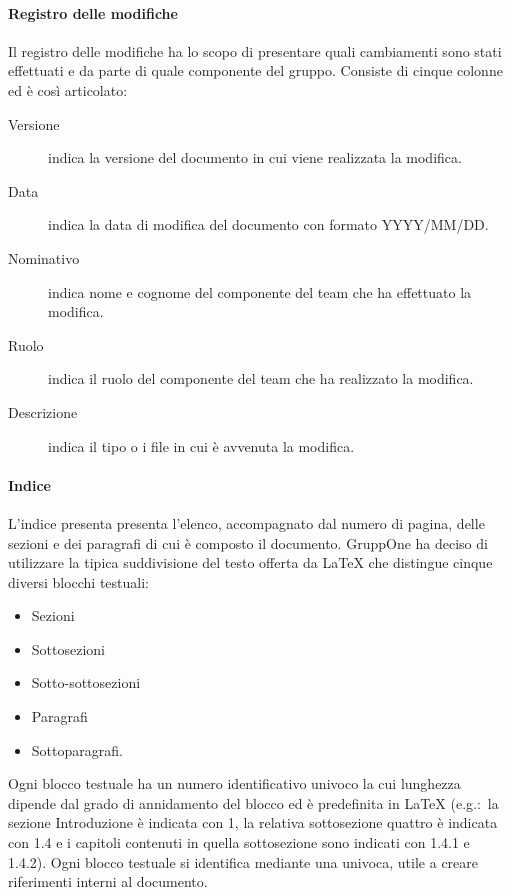\documentclass[../norme-di-progetto.tex]{subfiles}
\begin{document}
\paragraph{Registro delle modifiche}%
\label{par:registro_delle_modifiche}
Il registro delle modifiche ha lo scopo di presentare quali cambiamenti sono stati effettuati e da parte di quale componente del gruppo. Consiste di cinque colonne ed è così articolato:
\begin{description}
  \item [Versione] indica la versione del documento in cui viene realizzata la modifica.
  \item [Data] indica la data di modifica del documento con formato YYYY/MM/DD\@.
  \item [Nominativo] indica nome e cognome del componente del team che ha effettuato la modifica.
  \item [Ruolo] indica il ruolo del componente del team che ha realizzato la modifica.
  \item [Descrizione] indica il tipo o i file in cui è avvenuta la modifica.
\end{description}

\paragraph{Indice}%
\label{par:indice}
L'indice presenta presenta l'elenco, accompagnato dal numero di pagina, delle sezioni e dei paragrafi di cui è composto il documento.
GruppOne ha deciso di utilizzare la tipica suddivisione del testo offerta da \LaTeX{} che distingue cinque diversi blocchi testuali:
\begin{itemize}
  \item Sezioni
  \item Sottosezioni
  \item Sotto-sottosezioni
  \item Paragrafi
  \item Sottoparagrafi.
\end{itemize}

Ogni blocco testuale ha un numero identificativo univoco la cui lunghezza dipende dal grado di annidamento del blocco ed è predefinita in \LaTeX{} (e.g.:\ la sezione Introduzione è indicata con 1, la relativa sottosezione quattro è indicata con 1.4 e i capitoli contenuti in quella sottosezione sono indicati con 1.4.1 e 1.4.2).
Ogni blocco testuale si identifica mediante una  univoca, utile a creare riferimenti interni al documento.
\end{document}
